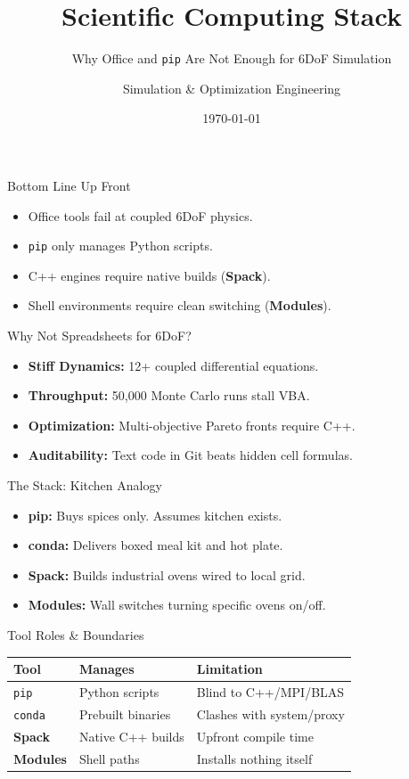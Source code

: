 \documentclass{beamer}
\title{Scientific Computing Stack}
\subtitle{Why Office and \texttt{pip} Are Not Enough for 6DoF Simulation}
\author{Simulation \& Optimization Engineering}
\date{\today}
\begin{document}
\begin{frame}
  \titlepage
\end{frame}

\begin{frame}{Bottom Line Up Front}
  \begin{itemize}
    \item Office tools fail at coupled 6DoF physics.
    \item \texttt{pip} only manages Python scripts.
    \item C++ engines require native builds (\textbf{Spack}).
    \item Shell environments require clean switching (\textbf{Modules}).
  \end{itemize}
\end{frame}

\begin{frame}{Why Not Spreadsheets for 6DoF?}
  \begin{itemize}
    \item \textbf{Stiff Dynamics:} 12+ coupled differential equations.
    \item \textbf{Throughput:} 50,000 Monte Carlo runs stall VBA.
    \item \textbf{Optimization:} Multi-objective Pareto fronts require C++.
    \item \textbf{Auditability:} Text code in Git beats hidden cell formulas.
  \end{itemize}
\end{frame}

\begin{frame}{The Stack: Kitchen Analogy}
  \begin{itemize}
    \item \textbf{pip:} Buys spices only. Assumes kitchen exists.
    \item \textbf{conda:} Delivers boxed meal kit and hot plate.
    \item \textbf{Spack:} Builds industrial ovens wired to local grid.
    \item \textbf{Modules:} Wall switches turning specific ovens on/off.
  \end{itemize}
\end{frame}

\begin{frame}{Tool Roles \& Boundaries}
  \begin{tabular}{lll}
    \hline
    \textbf{Tool} & \textbf{Manages} & \textbf{Limitation} \\
    \hline
    \texttt{pip} & Python scripts & Blind to C++/MPI/BLAS \\
    \texttt{conda} & Prebuilt binaries & Clashes with system/proxy \\
    \textbf{Spack} & Native C++ builds & Upfront compile time \\
    \textbf{Modules} & Shell paths & Installs nothing itself \\
    \hline
  \end{tabular}
\end{frame}
\end{document}
